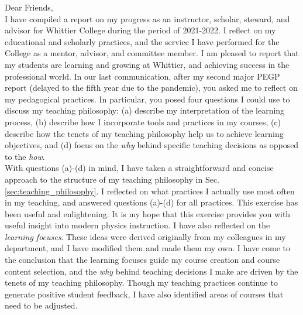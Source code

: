 \documentclass[../../main.tex]{subfiles}
\begin{document}
Dear Friends,
\\
\vspace{0.15cm}
I have compiled a report on my progress as an instructor, scholar, steward, and advisor for Whittier College during the period of 2021-2022.  I reflect on my educational and scholarly practices, and the service I have performed for the College as a mentor, advisor, and committee member.  I am pleased to report that my students are learning and growing at Whittier, and achieving success in the professional world.  In our last communication, after my second major PEGP report (delayed to the fifth year due to the pandemic), you asked me to reflect on my pedagogical practices.  In particular, you posed four questions I could use to discuss my teaching philosophy: (a) describe my interpretation of the learning process, (b) describe how I incorporate tools and practices in my courses, (c) describe how the tenets of my teaching philosophy help us to achieve learning objectives, and (d) focus on the \textit{why} behind specific teaching decisions as opposed to the \textit{how}.
\\
\vspace{0.25cm}
With questions (a)-(d) in mind, I have taken a straightforward and concise approach to the structure of my teaching philosophy in Sec. \ref{sec:teaching_philosophy}.  I reflected on what practices I actually use most often in my teaching, and answered questions (a)-(d) for all practices.  This exercise has been useful and enlightening.  It is my hope that this exercise provides you with useful insight into modern physics instruction.  I have also reflected on the \textit{learning focuses}.  These ideas were derived originally from my colleagues in my department, and I have modified them and made them my own.  I have come to the conclusion that the learning focuses guide my course creation and course content selection, and the \textit{why} behind teaching decisions I make are driven by the tenets of my teaching philosophy.  Though my teaching practices continue to generate positive student feedback, I have also identified areas of courses that need to be adjusted.
\\
\vspace{0.25cm}
\end{document}
